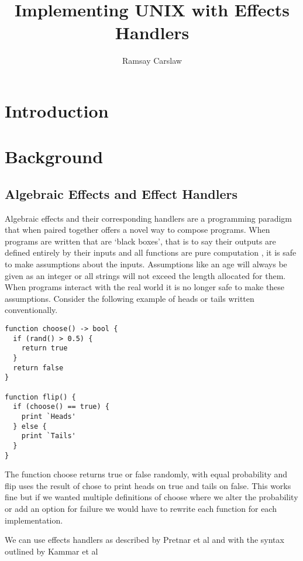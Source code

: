 \documentclass{report}
\title{Implementing UNIX with Effects Handlers}
\author{Ramsay Carslaw}
\begin{document}
\maketitle

\tableofcontents

\chapter{Introduction}

\chapter{Background}

\section{Algebraic Effects and Effect Handlers}

Algebraic effects and their corresponding handlers \cite{plotkin2009handlers}
\cite{pretnar2015introduction} are a programming paradigm that when paired
together offers a novel way to compose programs. When programs are written that
are `black boxes', that is to say their outputs are defined entirely by their
inputs and all functions are pure computation \cite{hughes1989functional}, it is
safe to make assumptions about the inputs. Assumptions like an age will always
be given as an integer or all strings will not exceed the length allocated for
them. When programs interact with the real world it is no longer safe to make
these assumptions. Consider the following example of heads or tails written
conventionally.

\begin{lstlisting}
function choose() -> bool {
  if (rand() > 0.5) {
    return true
  }
  return false
}

function flip() {
  if (choose() == true) {
    print `Heads'
  } else {
    print `Tails'
  }
}
\end{lstlisting}

The function choose returns true or false randomly, with equal probability and
flip uses the result of chose to print heads on true and tails on false. This
works fine but if we wanted multiple definitions of choose where we alter the
probability or add an option for failure we would have to rewrite each function
for each implementation.

We can use effects handlers as described by Pretnar et al \cite{pretnar2015introduction} and with the syntax outlined by Kammar et al \cite{kammar2013handlers}
\end{document}
